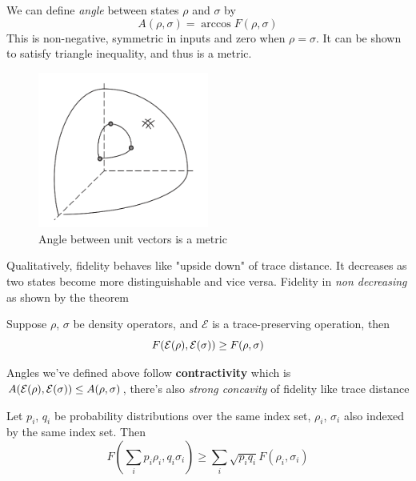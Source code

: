 We can define \textit{angle} between states $\rho$ and $\sigma$ by
\begin{equation}
    A(\rho, \sigma) = \arccos{F(\rho, \sigma)}
\end{equation}
This is non-negative, symmetric in inputs and zero when $\rho = \sigma$. It can be shown to satisfy triangle inequality, and thus is a metric.
\begin{figure}[H]
    \centering
    \includegraphics[width=0.5\textwidth]{images/fidelity_angle.png}
    \caption{Angle between unit vectors is a metric}
    \label{fig:fidelity-angle}
\end{figure}
Qualitatively, fidelity behaves like "upside down" of trace distance. It decreases as two states become more distinguishable and vice versa. Fidelity in \textit{non decreasing} as shown by the theorem
\begin{theorem}
    Suppose $\rho$, $\sigma$ be density operators, and $\mathcal{E}$ is a trace-preserving operation, then
    \begin{equation}
        F(\operatorname{\mathcal{E}}(\rho), \operatorname{\mathcal{E}}(\sigma)) \geq F(\rho, \sigma)
    \end{equation}
\end{theorem}
Angles we've defined above follow \textbf{contractivity} which is $A(\operatorname{\mathcal{E}}(\rho), \operatorname{\mathcal{E}}(\sigma)) \leq A(\rho, \sigma)$, there's also \textit{strong concavity} of fidelity like trace distance
\begin{theorem}
    Let $p_i$, $q_i$ be probability distributions over the same index set, $\rho_i$, $\sigma_i$ also indexed by the same index set. Then 
    \begin{equation}
        F \left( \sum_i p_i\rho_i, q_i\sigma_i \right)
        \geq
        \sum_i \sqrt{p_iq_i}F(\rho_i, \sigma_i)
    \end{equation}
\end{theorem}

